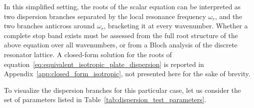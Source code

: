 In this simplified setting, the roots of the scalar equation can be interpreted as two dispersion branches separated by the local resonance frequency $\omega_r$, and the two branches anticross around $\omega_r$, bracketing it at every wavenumber. Whether a complete stop band exists must be assessed from the full root structure of the above equation over all wavenumbers, or from a Bloch analysis of the discrete resonator lattice.
A closed-form solution for the roots of equation~\eqref{eq:equivalent_isotropic_plate_dispersion} is reported in Appendix~\ref{app:closed_form_isotropic}, not presented here for the sake of brevity.

To visualize the dispersion branches for this particular case, let us consider the set of parameters listed in Table~\ref{tab:dispersion_test_parameters}.
%
%
%
